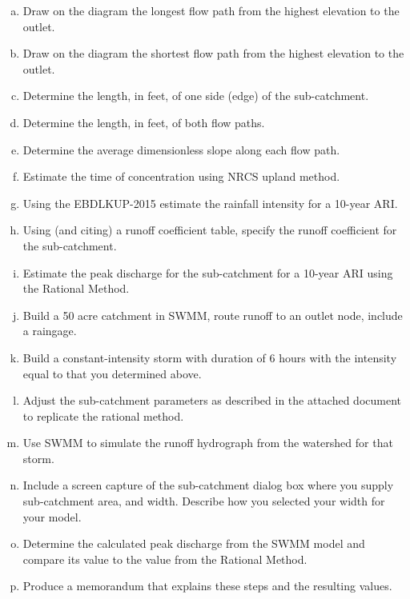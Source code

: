\documentclass[12pt]{article}
\begin{document}
\begin{enumerate}
\begin{enumerate}[a)]
\item Draw on the diagram the longest flow path from the highest elevation to the outlet.
\item Draw on the diagram the shortest flow path from the highest elevation to the outlet.
\item Determine the length, in feet, of one side (edge) of the sub-catchment.
\item Determine the length, in feet, of both flow paths.
\item Determine the average dimensionless slope along each flow path.
\item Estimate the time of concentration using NRCS upland method.
\item Using the EBDLKUP-2015 estimate the rainfall intensity for a 10-year ARI.
\item Using (and citing) a runoff coefficient table, specify the runoff coefficient for the sub-catchment.
\item Estimate the peak discharge for the sub-catchment for a 10-year ARI using the Rational Method.
\item Build a 50 acre catchment in SWMM, route runoff to an outlet node, include a raingage.
\item Build a constant-intensity storm with duration of 6 hours with the intensity equal to that you determined above.
\item Adjust the sub-catchment parameters as described in the attached document to replicate the rational method.
\item Use SWMM to simulate the runoff hydrograph from the watershed for that storm.
\item Include a screen capture of the sub-catchment dialog box where you supply sub-catchment area, and width.   
Describe how you selected your width for your model.   
\item Determine the calculated peak discharge from the SWMM model and compare its value to the value from the Rational Method.
\item Produce a memorandum that explains these steps and the resulting values.
\end{enumerate}
\end{enumerate}

\end{document}
